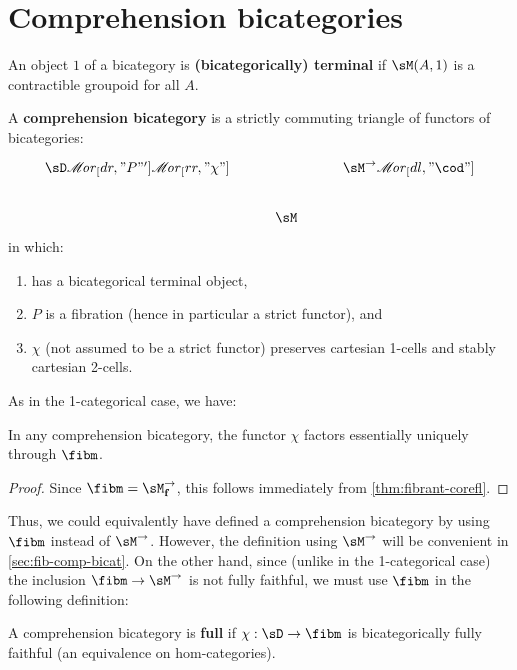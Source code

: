 \documentclass{amsart}
\def\ar#1{\mathscr{M}\!\mathit{or}_{#1}}
\def\f{_{\mathbf{f}}}
\begin{document}
\section{Comprehension bicategories}
\label{sec:comp-bicat}

An object $1$ of a bicategory \sM is \textbf{(bicategorically) terminal} if $\sM(A,1)$ is a contractible groupoid for all $A$.

\begin{defn}
  A \textbf{comprehension bicategory} is a strictly commuting triangle of functors of bicategories:
  \[
  \begin{tikzcd}
    \sD \ar[dr,"P"'] \ar[rr,"\chi"] && \sM^\to \ar[dl,"\cod"] \\
    & \sM
  \end{tikzcd}
  \]
  in which:
  \begin{enumerate}
  \item \sM has a bicategorical terminal object,
  \item $P$ is a fibration (hence in particular a strict functor), and
  \item $\chi$ (not assumed to be a strict functor) preserves cartesian 1-cells and stably cartesian 2-cells.
  \end{enumerate}
\end{defn}

As in the 1-categorical case, we have:

\begin{lem}\label{thm:bicc-fib}
  In any comprehension bicategory, the functor $\chi$ factors essentially uniquely through $\fibm$.
\end{lem}
\begin{proof}
  Since $\fibm = \sM^\to\f$, this follows immediately from \cref{thm:fibrant-corefl}.
\end{proof}

Thus, we could equivalently have defined a comprehension bicategory by using $\fibm$ instead of $\sM^\to$.
However, the definition using $\sM^\to$ will be convenient in \cref{sec:fib-comp-bicat}.
On the other hand, since (unlike in the 1-categorical case) the inclusion $\fibm \to \sM^\to$ is not fully faithful, we must use $\fibm$ in the following definition:

\begin{defn}
  A comprehension bicategory is \textbf{full} if $\chi:\sD\to \fibm$ is bicategorically fully faithful (an equivalence on hom-categories).
\end{defn}
\end{document}
